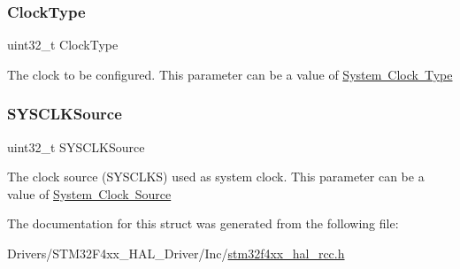 \subsubsection{\texorpdfstring{Clock\+Type}{ClockType}}
{\footnotesize\ttfamily uint32\+\_\+t Clock\+Type}

The clock to be configured. This parameter can be a value of \mbox{\hyperlink{group___r_c_c___system___clock___type}{System Clock Type}} \mbox{\label{struct_r_c_c___clk_init_type_def_a02b70c23b593a55814d887f483ea0871}} 
\subsubsection{\texorpdfstring{S\+Y\+S\+C\+L\+K\+Source}{SYSCLKSource}}
{\footnotesize\ttfamily uint32\+\_\+t S\+Y\+S\+C\+L\+K\+Source}

The clock source (S\+Y\+S\+C\+L\+KS) used as system clock. This parameter can be a value of \mbox{\hyperlink{group___r_c_c___system___clock___source}{System Clock Source}} 

The documentation for this struct was generated from the following file\+:\begin{DoxyCompactItemize}
\item 
Drivers/\+S\+T\+M32\+F4xx\+\_\+\+H\+A\+L\+\_\+\+Driver/\+Inc/\mbox{\hyperlink{stm32f4xx__hal__rcc_8h}{stm32f4xx\+\_\+hal\+\_\+rcc.\+h}}\end{DoxyCompactItemize}
